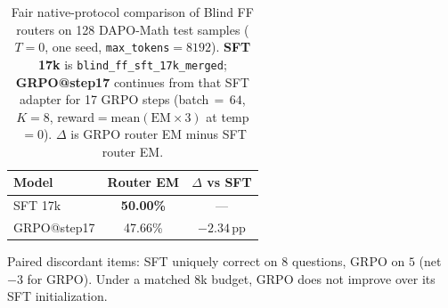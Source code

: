 \begin{table}[t]
\centering
\small
\setlength{\tabcolsep}{6pt}
\caption{Fair native-protocol comparison of Blind FF routers on 128 DAPO-Math
test samples ($T{=}0$, one seed, \texttt{max\_tokens}${}=8192$).
\textbf{SFT 17k} is \texttt{blind\_ff\_sft\_17k\_merged};
\textbf{GRPO@step17} continues from that SFT adapter for 17 GRPO steps
(batch$\,{=}\,64$, $K{=}8$, reward${=}\mathrm{mean}(\mathrm{EM}{\times}3)$ at temp$\,{=}0$).
$\Delta$ is GRPO router EM minus SFT router EM.}
\label{tab:sft17k-vs-grpo-step17-8kfair}
\begin{tabular}{lcc}
\toprule
\textbf{Model} & \textbf{Router EM} & \textbf{$\Delta$ vs SFT} \\
\midrule
SFT 17k
  & \textbf{50.00\%}
  & --- \\
GRPO@step17
  & 47.66\%
  & \textcolor{red!70!black}{$-2.34$\,pp} \\
\bottomrule
\end{tabular}

\vspace{0.25em}
{\scriptsize
Paired discordant items: SFT uniquely correct on $8$ questions, GRPO on $5$
(net $-3$ for GRPO).
Under a matched 8k budget, GRPO does not improve over its SFT initialization.
}
\end{table}
